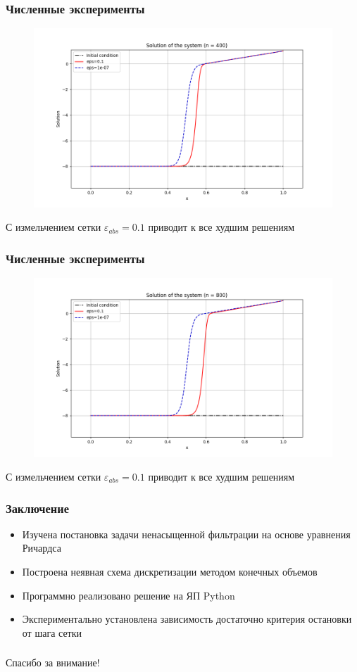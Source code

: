 \documentclass{beamer}
\begin{document}
	\begin{frame}
	\frametitle{Численные эксперименты}
	\begin{figure}[h] \centering
		\includegraphics[width=1\textwidth]{n400}
	\end{figure}
	С измельчением сетки $\varepsilon_{abs} = 0.1$ приводит к все худшим решениям
	\end{frame}
	
	\begin{frame}
	\frametitle{Численные эксперименты}
	\begin{figure}[h] \centering
		\includegraphics[width=1\textwidth]{n800}
	\end{figure}
	С измельчением сетки $\varepsilon_{abs} = 0.1$ приводит к все худшим решениям
	\end{frame}
	
	\begin{frame}
	\frametitle{Заключение}
	\begin{itemize}
		\item Изучена постановка задачи ненасыщенной фильтрации на основе уравнения Ричардса
		\item Построена неявная схема дискретизации методом конечных объемов
		\item Программно реализовано решение на ЯП Python
		\item Экспериментально установлена зависимость достаточно критерия остановки от шага сетки
	\end{itemize}
	\end{frame}
	
		\begin{frame}
		\frametitle{}
		\centering\Large Спасибо за внимание!
	\end{frame}
	
\end{document}
